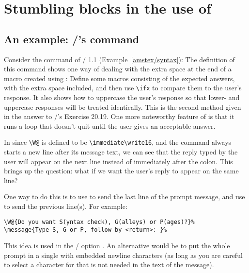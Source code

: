 {\begin{example}
\begin{examplebox}
\end{examplebox}%
\end{example}

\section{Stumbling blocks in the use of }
\label{s:stumbleread}

\subsection{An example: \amstex/'s  command}

Consider the  command of \amstex/ 1.1
(Example~\ref{amstex/syntax}):
The definition of this command shows one way of dealing
with the extra space at the end of a macro created using :
Define some macros consisting of the expected answers, with the extra
space included, and then use \verb|\ifx| to compare them to the
user's response. It also shows how to uppercase the user's response
so that lower- and uppercase responses will be treated identically.
This is the second method given in the answer to \texbook/'s Exercise
20.19. One more noteworthy feature of  is that it
runs a loop that doesn't quit until the user gives an acceptable
answer.

In  since \verb|\W@| is defined to be
\verb|\immediate|\5\verb|\write16|, and the  command always
starts a new line after its message text, we can see that the reply
typed by the user will appear on the next line instead of immediately
after the colon. This brings up the question: what if we want the
user's reply to appear on the same line?

One way to do this is to use  to send the last line of
the prompt message, and use  to send the previous line(s).
For example:
 \begin{verbatim}
\W@{Do you want S(yntax check), G(alleys) or P(ages)?}%
\message{Type S, G or P, follow by <return>: }%
\end{verbatim}
 This idea is used in the \latex/ option 
\cite{checknum}. An alternative would be to put the whole prompt in a
single  with embedded newline characters (as long as you
are careful to select a character for  that is not
needed in the text of the message).

}

